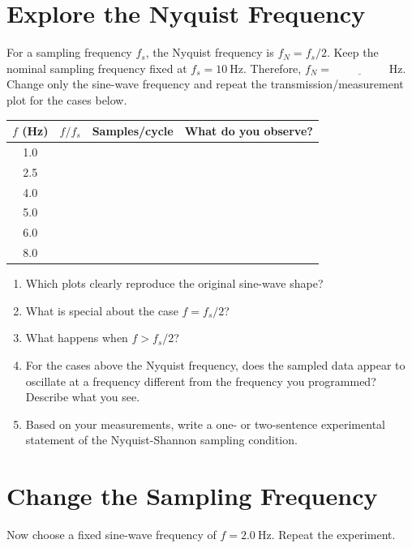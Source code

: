 \documentclass[11pt]{article}
\begin{document}
\section{Explore the Nyquist Frequency}

For a sampling frequency $f_s$, the Nyquist frequency is $f_N=f_s/2$.  Keep the nominal sampling frequency fixed at $f_s=10\ \mathrm{Hz}$.  Therefore, $f_N=\underline{\hspace{2cm}}\ \mathrm{Hz}$.  Change only the sine-wave frequency and repeat the transmission/measurement plot for the cases below.

\begin{center}
\renewcommand{\arraystretch}{1.35}
\begin{tabular}{c c c p{5.3cm}}
\toprule
\textbf{$f$ (Hz)} & \textbf{$f/f_s$} & \textbf{Samples/cycle} & \textbf{What do you observe?} \\
\midrule
1.0 & & & \\
2.5 & & & \\
4.0 & & & \\
5.0 & & & \\
6.0 & & & \\
8.0 & & & \\
\bottomrule
\end{tabular}
\end{center}

\begin{enumerate}[label=\alph*)]
    \item Which plots clearly reproduce the original sine-wave shape?
    \item What is special about the case $f=f_s/2$?
    \item What happens when $f>f_s/2$?
    \item For the cases above the Nyquist frequency, does the sampled data appear to oscillate at a frequency different from the frequency you programmed? Describe what you see.
    \item Based on your measurements, write a one- or two-sentence experimental statement of the Nyquist-Shannon sampling condition.
\end{enumerate}

\section{Change the Sampling Frequency}

Now choose a fixed sine-wave frequency of $f=2.0\ \mathrm{Hz}$.  Repeat the experiment.
\end{document}
